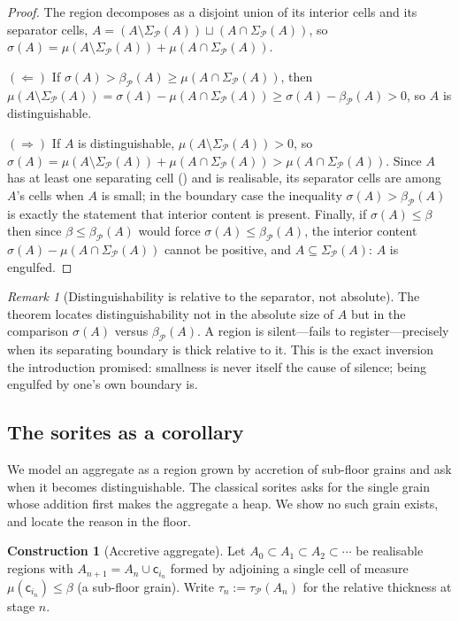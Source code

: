 \documentclass[11pt,twocolumn,a4paper]{article}
\theoremstyle{thmstyle}
\theoremstyle{definition}
\newtheorem{construction}[theorem]{Construction}
\theoremstyle{remark}
\newtheorem{remark}[theorem]{Remark}
\newcommand{\thick}{\beta}
\newcommand{\Part}{\mathscr{P}}
\newcommand{\cell}{\mathsf{c}}
\begin{document}
\begin{proof}
The region decomposes as a disjoint union of its interior cells and its
separator cells, $A=(A\setminus\Sigma_\Part(A))\sqcup(A\cap\Sigma_\Part(A))$, so
$\sigma(A)=\mu(A\setminus\Sigma_\Part(A))+\mu(A\cap\Sigma_\Part(A))$.

$(\Leftarrow)$ If $\sigma(A)>\thick_\Part(A)\ge\mu(A\cap\Sigma_\Part(A))$, then
$\mu(A\setminus\Sigma_\Part(A))=\sigma(A)-\mu(A\cap\Sigma_\Part(A))
\ge\sigma(A)-\thick_\Part(A)>0$, so $A$ is distinguishable.

$(\Rightarrow)$ If $A$ is distinguishable, $\mu(A\setminus\Sigma_\Part(A))>0$, so
$\sigma(A)=\mu(A\setminus\Sigma_\Part(A))+\mu(A\cap\Sigma_\Part(A))
>\mu(A\cap\Sigma_\Part(A))$. Since $A$ has at least one separating cell
() and is realisable, its separator cells are among $A$'s
cells when $A$ is small; in the boundary case the inequality
$\sigma(A)>\thick_\Part(A)$ is exactly the statement that interior content is
present. Finally, if $\sigma(A)\le\thick$ then since
$\thick\le\thick_\Part(A)$ would force $\sigma(A)\le\thick_\Part(A)$, the
interior content $\sigma(A)-\mu(A\cap\Sigma_\Part(A))$ cannot be positive, and
$A\subseteq\Sigma_\Part(A)$: $A$ is engulfed.
\end{proof}

\begin{remark}[Distinguishability is relative to the separator, not absolute]
\label{rem:relative}
The theorem locates distinguishability not in the absolute size of $A$ but in the
comparison $\sigma(A)$ versus $\thick_\Part(A)$. A region is silent---fails to
register---precisely when its separating boundary is thick relative to it. This
is the exact inversion the introduction promised: smallness is never itself the
cause of silence; being engulfed by one's own boundary is.
\end{remark}

\subsection{The sorites as a corollary}

We model an aggregate as a region grown by accretion of sub-floor grains and ask
when it becomes distinguishable. The classical sorites asks for the single grain
whose addition first makes the aggregate a heap. We show no such grain exists,
and locate the reason in the floor.

\begin{construction}[Accretive aggregate]
\label{con:accretion}
Let $A_0\subset A_1\subset A_2\subset\cdots$ be realisable regions with
$A_{n+1}=A_n\cup\cell_{i_n}$ formed by adjoining a single cell of measure
$\mu(\cell_{i_n})\le\thick$ \textup{(}a sub-floor grain\textup{)}. Write
$\tau_n:=\tau_\Part(A_n)$ for the relative thickness at stage $n$.
\end{construction}
\end{document}
